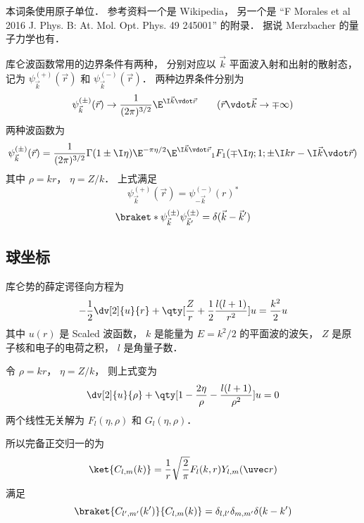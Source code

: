 
本词条使用原子单位． 参考资料一个是 Wikipedia， 另一个是 “F Morales et al 2016 J. Phys. B: At. Mol. Opt. Phys. 49 245001” 的附录． 据说 Merzbacher 的量子力学也有．

库仑波函数常用的边界条件有两种， 分别对应以 $\vec k$ 平面波入射和出射的散射态， 记为 $\psi_{\vec k}^{(+)}(\vec r)$ 和 $\psi_{\vec k}^{(-)}(\vec r)$． 两种边界条件分别为
\begin{equation}
\psi_{\vec k}^{(\pm)}(\vec r) \to \frac{1}{(2\pi)^{3/2}} \E^{\I\vec k\vdot\vec r}
\qquad
(\vec r\vdot \vec k \to \mp\infty)
\end{equation}
两种波函数为
\begin{equation}
\psi_{\vec k}^{(\pm)}(\vec r) = \frac{1}{(2\pi)^{3/2}} \Gamma(1\pm \I\eta)\E^{-\pi\eta/2} \E^{\I\vec k\vdot\vec r} {_1F_1}(\mp\I\eta; 1; \pm\I kr - \I \vec k\vdot \vec r)
\end{equation}
其中 $\rho = kr$， $\eta = Z/k$． 上式满足
\begin{equation}
\psi_{\vec k}^{(+)}(\vec r) = \psi_{-\vec k}^{(-)}(r)^*
\end{equation}
\begin{equation}
\braket*{\psi_{\vec k}^{(\pm)}}{\psi_{\vec k'}^{(\pm)}} = \delta(\vec k - \vec k')
\end{equation}

\subsection{球坐标}
库仑势的薛定谔径向方程为
\begin{equation}
-\frac12 \dv[2]{u}{r} + \qty[\frac{Z}{r} + \frac12 \frac{l(l+1)}{r^2}]u = \frac{k^2}{2}u
\end{equation}
其中 $u(r)$ 是 Scaled 波函数， $k$ 是能量为 $E = k^2/2$ 的平面波的波矢， $Z$ 是原子核和电子的电荷之积， $l$ 是角量子数．

令 $\rho = kr$， $\eta = Z/k$， 则上式变为
\begin{equation}
\dv[2]{u}{\rho} + \qty[1 - \frac{2\eta}{\rho} - \frac{l(l+1)}{\rho^2}]u = 0
\end{equation}
两个线性无关解为 $F_l(\eta, \rho)$ 和 $G_l(\eta, \rho)$．

所以完备正交归一的为
\begin{equation}
\ket{C_{l,m}(k)} = \frac{1}{r} \sqrt{\frac{2}{\pi}} F_l(k,r) Y_{l,m}(\uvec r)
\end{equation}
满足
\begin{equation}
\braket{C_{l',m'}(k')}{C_{l,m}(k)} = \delta_{l,l'}\delta_{m,m'}\delta(k-k')
\end{equation}

